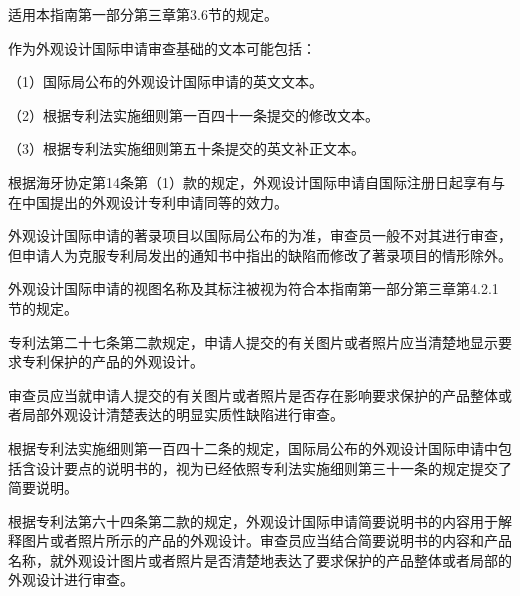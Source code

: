 适用本指南第一部分第三章第3.6节的规定。

作为外观设计国际申请审查基础的文本可能包括：

{\setlength{\parindent}{17.1bp}（1）国际局公布的外观设计国际申请的英文文本。\par}

{\setlength{\parindent}{17.1bp}（2）根据专利法实施细则第一百四十一条提交的修改文本。\par}

{\setlength{\parindent}{17.1bp}（3）根据专利法实施细则第五十条提交的英文补正文本。\par}

根据海牙协定第14条第（1）款的规定，外观设计国际申请自国际注册日起享有与在中国提出的外观设计专利申请同等的效力。

外观设计国际申请的著录项目以国际局公布的为准，审查员一般不对其进行审查，但申请人为克服专利局发出的通知书中指出的缺陷而修改了著录项目的情形除外。

外观设计国际申请的视图名称及其标注被视为符合本指南第一部分第三章第4.2.1节的规定。

专利法第二十七条第二款规定，申请人提交的有关图片或者照片应当清楚地显示要求专利保护的产品的外观设计。

审查员应当就申请人提交的有关图片或者照片是否存在影响要求保护的产品整体或者局部外观设计清楚表达的明显实质性缺陷进行审查。

根据专利法实施细则第一百四十二条的规定，国际局公布的外观设计国际申请中包括含设计要点的说明书的，视为已经依照专利法实施细则第三十一条的规定提交了简要说明。

根据专利法第六十四条第二款的规定，外观设计国际申请简要说明书的内容用于解释图片或者照片所示的产品的外观设计。审查员应当结合简要说明书的内容和产品名称，就外观设计图片或者照片是否清楚地表达了要求保护的产品整体或者局部的外观设计进行审查。

